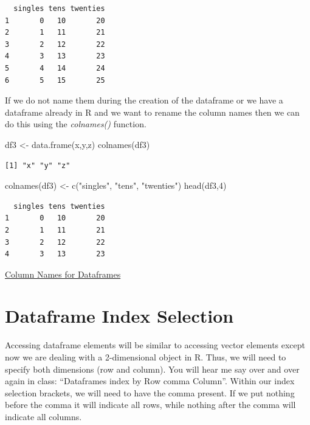 \documentclass[
  letterpaper,
  DIV=11,
  numbers=noendperiod]{scrreprt}
\newenvironment{Shaded}{\begin{snugshade}}{\end{snugshade}}
\newcommand{\DecValTok}[1]{\textcolor[rgb]{0.68,0.00,0.00}{#1}}
\newcommand{\FunctionTok}[1]{\textcolor[rgb]{0.28,0.35,0.67}{#1}}
\newcommand{\NormalTok}[1]{\textcolor[rgb]{0.00,0.23,0.31}{#1}}
\newcommand{\OtherTok}[1]{\textcolor[rgb]{0.00,0.23,0.31}{#1}}
\newcommand{\StringTok}[1]{\textcolor[rgb]{0.13,0.47,0.30}{#1}}
\begin{document}
\begin{verbatim}
  singles tens twenties
1       0   10       20
2       1   11       21
3       2   12       22
4       3   13       23
5       4   14       24
6       5   15       25
\end{verbatim}

If we do not name them during the creation of the dataframe or we have a
dataframe already in R and we want to rename the column names then we
can do this using the \emph{colnames()} function.

\begin{Shaded}
\begin{Highlighting}[]
\NormalTok{df3 }\OtherTok{\textless{}{-}} \FunctionTok{data.frame}\NormalTok{(x,y,z)}
\FunctionTok{colnames}\NormalTok{(df3)}
\end{Highlighting}
\end{Shaded}

\begin{verbatim}
[1] "x" "y" "z"
\end{verbatim}

\begin{Shaded}
\begin{Highlighting}[]
\FunctionTok{colnames}\NormalTok{(df3) }\OtherTok{\textless{}{-}} \FunctionTok{c}\NormalTok{(}\StringTok{"singles"}\NormalTok{, }\StringTok{"tens"}\NormalTok{, }\StringTok{"twenties"}\NormalTok{)}
\FunctionTok{head}\NormalTok{(df3,}\DecValTok{4}\NormalTok{)}
\end{Highlighting}
\end{Shaded}

\begin{verbatim}
  singles tens twenties
1       0   10       20
2       1   11       21
3       2   12       22
4       3   13       23
\end{verbatim}

\begin{watch}{}{}
    \href{https://youtu.be/jzJfkWANAMU}{Column Names for Dataframes}
\end{watch}

\section{Dataframe Index Selection}\label{dataframe-index-selection}

Accessing dataframe elements will be similar to accessing vector
elements except now we are dealing with a 2-dimensional object in R.
Thus, we will need to specify both dimensions (row and column). You will
hear me say over and over again in class: ``Dataframes index by Row
comma Column''. Within our index selection brackets, we will need to
have the comma present. If we put nothing before the comma it will
indicate all rows, while nothing after the comma will indicate all
columns.
\end{document}
